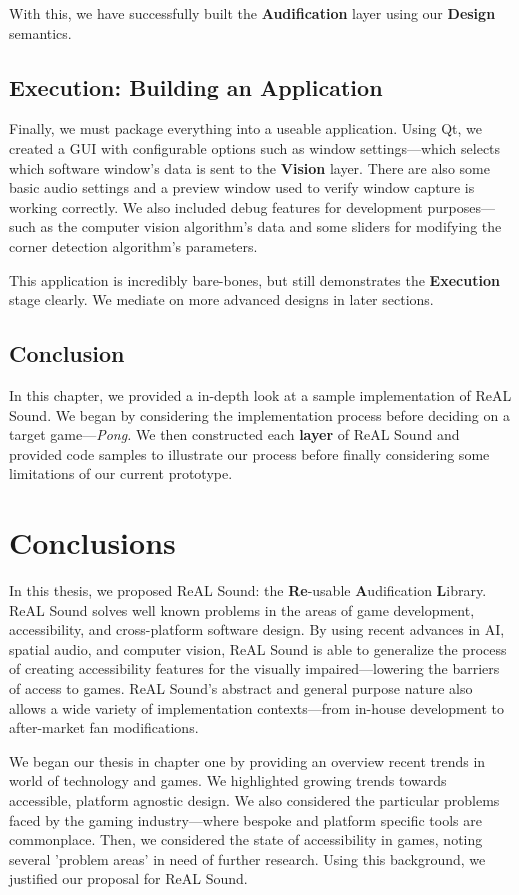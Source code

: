 \documentclass{report}
\newcommand{\rs}{ReAL Sound\xspace}
\newcommand{\rsfull}{\textbf{Re}-usable \textbf{A}udification \textbf{L}ibrary\xspace}
\newcommand{\design}{\textbf{Design}\xspace}
\newcommand{\exec}{\textbf{Execution}\xspace}
\newcommand{\state}[1]{\textbf{#1}}
\newcommand{\vision}{\textbf{Vision}\xspace}
\newcommand{\audio}{\textbf{Audification}\xspace}
\begin{document}
With this, we have successfully built the \audio layer using our \design semantics. 

\section {Execution: Building an Application}
Finally, we must package everything into a useable application. Using Qt, we created a GUI with configurable options such as window settings---which selects which software window's data is sent to the \vision layer. There are also some basic audio settings and a preview window used to verify window capture is working correctly. We also included debug features for development purposes---such as the computer vision algorithm's data and some sliders for modifying the corner detection algorithm's parameters.

This application is incredibly bare-bones, but still demonstrates the \exec stage clearly. We mediate on more advanced designs in later sections.

\section{Conclusion}
In this chapter, we provided a in-depth look at a sample implementation of \rs. We began by considering the implementation process before deciding on a target game---\emph{Pong.} We then constructed each \state{layer} of \rs and provided code samples to illustrate our process before finally considering some limitations of our current prototype. 

\chapter{Conclusions}
In this thesis, we proposed \rs: the \rsfull. \rs solves well known problems in the areas of game development, accessibility, and cross-platform software design. By using recent advances in AI, spatial audio, and computer vision, \rs is able to generalize the process of creating accessibility features for the visually impaired---lowering the barriers of access to games. \rs's abstract and general purpose nature also allows a wide variety of implementation contexts---from in-house development to after-market fan modifications.

We began our thesis in chapter one by providing an overview recent trends in world of technology and games. We highlighted growing trends towards accessible, platform agnostic design. We also considered the particular problems faced by the gaming industry---where bespoke and platform specific tools are commonplace. Then, we considered the state of accessibility in games, noting several 'problem areas' in need of further research. Using this background, we justified our proposal for \rs. 
\end{document}
